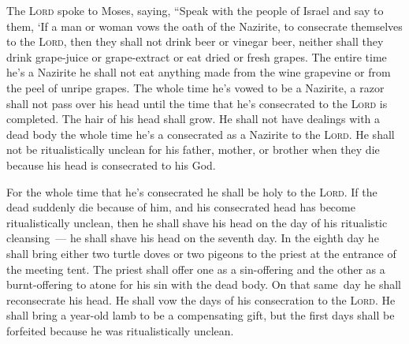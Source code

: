 
\begin{inparaenum}
   The \textsc{Lord} spoke to Moses, saying,%
   ``Speak with the people of Israel and say to them, `If a man or woman vows the oath of the Nazirite, to consecrate themselves to the \textsc{Lord},%
   then they shall not drink beer or vinegar beer, neither shall they drink grape-juice or grape-extract or eat dried or fresh grapes.%
   The entire time he's a Nazirite he shall not eat anything made from the wine grapevine or from the peel of unripe grapes.%
   The whole time he's vowed to be a Nazirite, a razor shall not pass over his head until the time that he's consecrated to the \textsc{Lord} is completed. The hair of his head shall grow.%
   He shall not have dealings with a dead body the whole time he's a consecrated as a Nazirite to the \textsc{Lord}.%
   He shall not be ritualistically unclean for his father, mother, or brother when they die because his head is consecrated to his God.%
  
   For the whole time that he's consecrated he shall be holy to the \textsc{Lord}.%
   If the dead suddenly die because of him, and his consecrated head has become ritualistically unclean, then he shall shave his head on the day of his ritualistic cleansing~--- he shall shave his head on the seventh day.%
   In the eighth day he shall bring either two turtle doves or two pigeons to the priest at the entrance of the meeting tent.%
   The priest shall offer one as a sin-offering and the other as a burnt-offering to atone for his sin with the dead body. On that same\understood\ day he shall reconsecrate his head.%
   He shall vow the days of his consecration to the \textsc{Lord}. He shall bring a year-old lamb to be a compensating gift, but the first days shall be forfeited because he was ritualistically unclean.%
  

\end{inparaenum}
